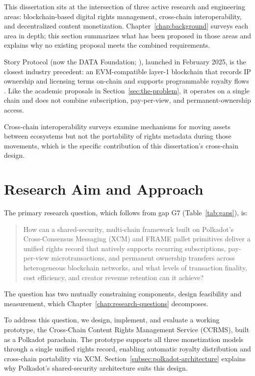 This dissertation sits at the intersection of three active research and engineering areas: blockchain-based digital rights management, cross-chain interoperability, and decentralized content monetization. Chapter~\ref{chap:background} surveys each area in depth; this section summarizes what has been proposed in those areas and explains why no existing proposal meets the combined requirements.

Story Protocol (now the DATA Foundation; \citealp{datafoundation2026}), launched in February 2025, is the closest industry precedent: an EVM-compatible layer-1 blockchain that records IP ownership and licensing terms on-chain and supports programmable royalty flows \citep{storyFoundation2025}. Like the academic proposals in Section~\ref{sec:the-problem}, it operates on a single chain and does not combine subscription, pay-per-view, and permanent-ownership access.

Cross-chain interoperability surveys \citep{renEtAl2023, dengEtAl2025, liEtAl2025a} examine mechanisms for moving assets between ecosystems but not the portability of rights metadata during those movements, which is the specific contribution of this dissertation's cross-chain design.

\section{Research Aim and Approach}\label{sec:research-aim-and-approach}

The primary research question, which follows from gap G7 (Table~\ref{tab:gaps}), is:

\begin{quote}
How can a shared-security, multi-chain framework built on Polkadot's Cross-Consensus Messaging (XCM) and FRAME pallet primitives deliver a unified rights record that natively supports recurring subscriptions, pay-per-view microtransactions, and permanent ownership transfers across heterogeneous blockchain networks, and what levels of transaction finality, cost efficiency, and creator revenue retention can it achieve?
\end{quote}

The question has two mutually constraining components, design feasibility and measurement, which Chapter~\ref{chap:research-questions} decomposes.

To address this question, we design, implement, and evaluate a working prototype, the Cross-Chain Content Rights Management Service (CCRMS), built as a Polkadot parachain. The prototype supports all three monetization models through a single unified rights record, enabling automatic royalty distribution and cross-chain portability via XCM. Section~\ref{subsec:polkadot-architecture} explains why Polkadot's shared-security architecture suits this design.

